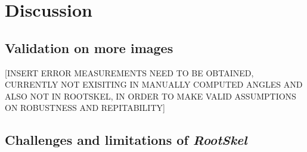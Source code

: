 
\chapter{Discussion} %

\label{discussion} %

%





\section{Validation on more images}

[INSERT ERROR MEASUREMENTS NEED TO BE OBTAINED, CURRENTLY NOT EXISITING IN MANUALLY COMPUTED ANGLES AND ALSO NOT IN ROOTSKEL, IN ORDER TO MAKE VALID ASSUMPTIONS ON ROBUSTNESS AND REPITABILITY]



\section{Challenges and limitations of \textit{RootSkel}}

